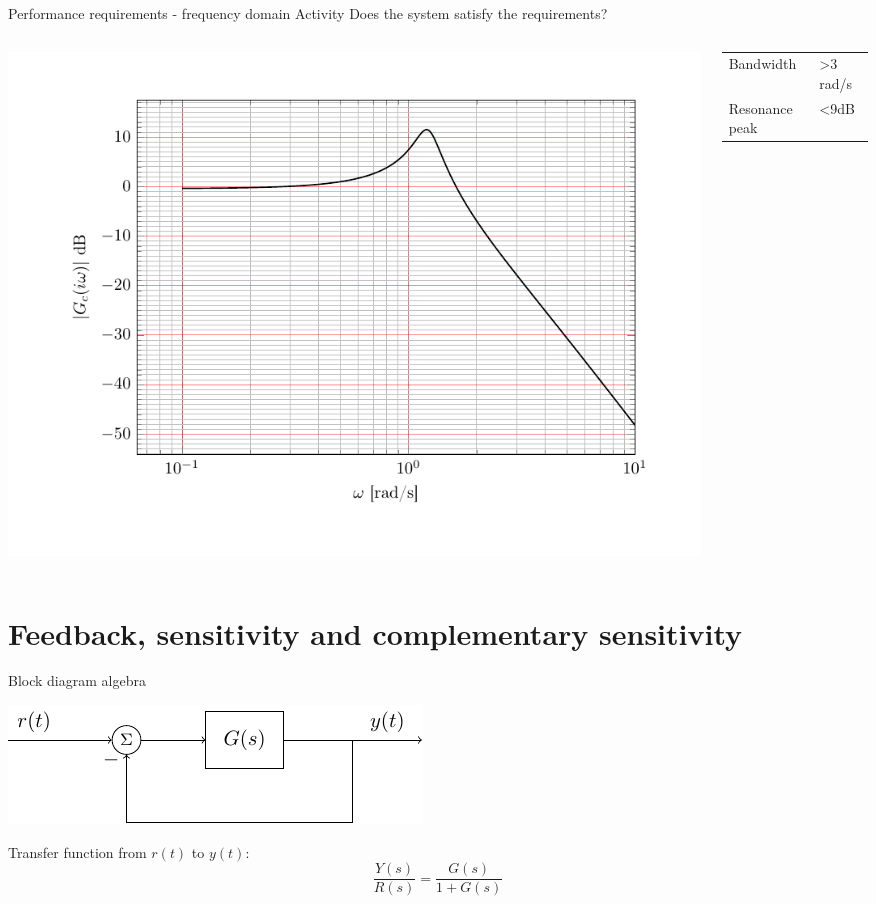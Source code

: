 \documentclass[presentation,aspectratio=169, usenames, dvipsnames]{beamer}
\begin{document}
\begin{frame}[label={sec:org10c4d2c}]{Performance requirements - frequency domain}
\alert{Activity} Does the system satisfy the requirements?


\begin{columns}
\begin{column}{0.7\columnwidth}
\begin{center}
 \includegraphics[width=1.0\linewidth]{../../figures/bode-closed-loop-example}
\end{center}
\end{column}
\begin{column}{0.3\columnwidth}
\begin{center}
\begin{tabular}{ll}
Bandwidth & >3 rad/s\\
Resonance peak & <9dB\\
\end{tabular}
\end{center}
\end{column}
\end{columns}
\end{frame}




\section{Feedback, sensitivity and complementary sensitivity}
\label{sec:org2cd98ba}

\begin{frame}[label={sec:org205a6a1}]{Block diagram algebra}
\begin{center}
  \includegraphics[width=.6\linewidth]{../../figures/block-simple-feedback}
\end{center}

Transfer function from \(r(t)\) to \(y(t)\):
\[ \frac{Y(s)}{R(s)} = \frac{G(s)}{ 1+ G(s)}\]
\end{frame}
\end{document}
